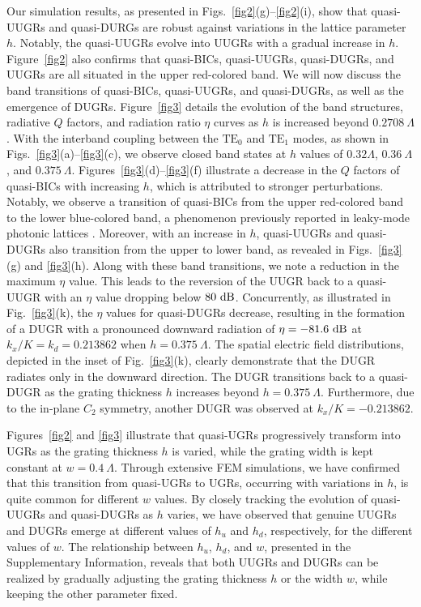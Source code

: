 \documentclass[%
 reprint,
superscriptaddress,
 amsmath,amssymb, aps,
]{revtex4-1}
\begin{document}
Our simulation results, as presented in Figs.~\ref{fig2}(g)--\ref{fig2}(i), show that quasi-UUGRs and quasi-DURGs are robust against variations in the lattice parameter $h$. Notably, the quasi-UUGRs evolve into UUGRs with a gradual increase in $h$. Figure~\ref{fig2} also confirms that quasi-BICs, quasi-UUGRs, quasi-DUGRs, and UUGRs are all situated in the upper red-colored band. We will now discuss the band transitions of quasi-BICs, quasi-UUGRs, and quasi-DUGRs, as well as the emergence of DUGRs. Figure~\ref{fig3} details the evolution of the band structures, radiative $Q$ factors, and radiation ratio $\eta$ curves as $h$ is increased beyond $0.2708~\Lambda$. With the interband coupling between the $\mathrm{TE}_{0}$ and $\mathrm{TE}_{1}$ modes, as shown in Figs.~\ref{fig3}(a)--\ref{fig3}(c), we observe closed band states at $h$ values of $0.32\Lambda$, $0.36~\Lambda$, and $0.375~\Lambda$. Figures~\ref{fig3}(d)--\ref{fig3}(f) illustrate a decrease in the $Q$ factors of quasi-BICs with increasing $h$, which is attributed to stronger perturbations. Notably, we observe a transition of quasi-BICs from the upper red-colored band to the lower blue-colored band, a phenomenon previously reported in leaky-mode photonic lattices \cite{SGLee2020-1}. Moreover, with an increase in $h$, quasi-UUGRs and quasi-DUGRs also transition from the upper to lower band, as revealed in Figs.~\ref{fig3}(g) and \ref{fig3}(h). Along with these band transitions, we note a reduction in the maximum $\eta$ value. This leads to the reversion of the UUGR back to a quasi-UUGR with an $\eta$ value dropping below $80~\rm{dB}$. Concurrently, as illustrated in Fig.~\ref{fig3}(k), the $\eta$ values for quasi-DUGRs decrease, resulting in the formation of a DUGR with a pronounced downward radiation of $\eta = -81.6~\rm{dB}$ at $k_x/K = k_d=0.213862$ when $h=0.375~\Lambda$. The spatial electric field distributions, depicted in the inset of Fig.~\ref{fig3}(k), clearly demonstrate that the DUGR radiates only in the downward direction. The DUGR transitions back to a quasi-DUGR as the grating thickness $h$ increases beyond $h=0.375~\Lambda$. Furthermore, due to the in-plane $C_2$ symmetry, another DUGR was observed at $k_x/K =-0.213862$.

Figures~\ref{fig2} and \ref{fig3} illustrate that quasi-UGRs progressively transform into UGRs as the grating thickness $h$ is varied, while the grating width is kept constant at $w=0.4~\Lambda$. Through extensive FEM simulations, we have confirmed that this transition from quasi-UGRs to UGRs, occurring with variations in $h$, is quite common for different $w$ values. By closely tracking the evolution of quasi-UUGRs and quasi-DUGRs as $h$ varies, we have observed that genuine UUGRs and DUGRs emerge at different values of $h_u$ and $h_d$, respectively, for the different values of $w$. The relationship between $h_u$, $h_d$, and $w$, presented in the Supplementary Information, reveals that both UUGRs and DUGRs can be realized by gradually adjusting the grating thickness $h$ or the width $w$, while keeping the other parameter fixed. 
\end{document}
